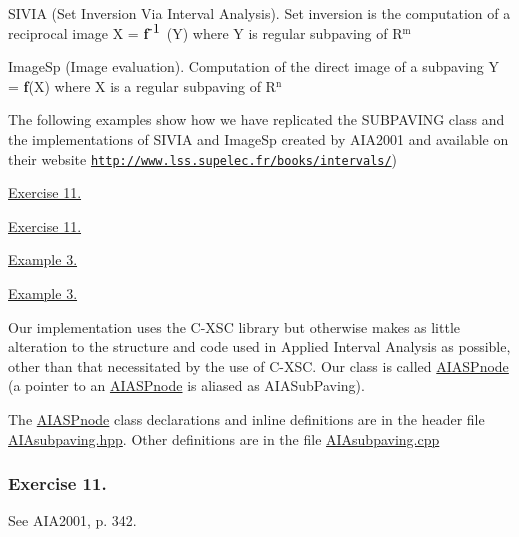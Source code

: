 \begin{DoxyItemize}
\item \-S\-I\-V\-I\-A (\-Set \-Inversion \-Via \-Interval \-Analysis). \-Set inversion is the computation of a reciprocal image \-X = {\bfseries f}$^{\mbox{-\/1}}$ (\-Y) where \-Y is regular subpaving of \-R$^{\mbox{m}}$  
\item \-Image\-Sp (\-Image evaluation). \-Computation of the direct image of a subpaving \-Y = {\bfseries f}(\-X) where \-X is a regular subpaving of \-R$^{\mbox{n}}$  
\end{DoxyItemize}

\-The following examples show how we have replicated the \-S\-U\-B\-P\-A\-V\-I\-N\-G class and the implementations of \-S\-I\-V\-I\-A and \-Image\-Sp created by \-A\-I\-A2001 and available on their website \href{http://www.lss.supelec.fr/books/intervals/}{\tt http\-://www.\-lss.\-supelec.\-fr/books/intervals/})


\begin{DoxyItemize}
\item \hyperlink{AIASubPavings_AIAexamsec_11_33}{\-Exercise 11.}
\item \hyperlink{AIASubPavings_AIAexamsec_11_35}{\-Exercise 11.}
\item \hyperlink{AIASubPavings_AIAexamsec_3_3}{\-Example 3.}
\item \hyperlink{AIASubPavings_AIAexamsec_3_4}{\-Example 3.}
\end{DoxyItemize}

\-Our implementation uses the \-C-\/\-X\-S\-C library but otherwise makes as little alteration to the structure and code used in \-Applied \-Interval \-Analysis as possible, other than that necessitated by the use of \-C-\/\-X\-S\-C. \-Our class is called \hyperlink{classAIASPnode}{\-A\-I\-A\-S\-Pnode} (a pointer to an \hyperlink{classAIASPnode}{\-A\-I\-A\-S\-Pnode} is aliased as \-A\-I\-A\-Sub\-Paving).

\-The \hyperlink{classAIASPnode}{\-A\-I\-A\-S\-Pnode} class declarations and inline definitions are in the header file \hyperlink{AIAsubpaving_8hpp}{\-A\-I\-Asubpaving.\-hpp}. \-Other definitions are in the file \hyperlink{AIAsubpaving_8cpp}{\-A\-I\-Asubpaving.\-cpp}\hypertarget{AIASubPavings_AIAexamsec_11_33}{}\subsubsection{\-Exercise 11.}\label{AIASubPavings_AIAexamsec_11_33}
\-See \-A\-I\-A2001, p. 342.

